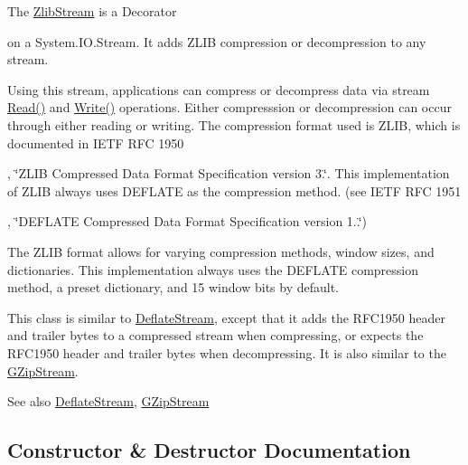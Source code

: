 The \mbox{\hyperlink{class_super_tiled2_unity_1_1_ionic_1_1_zlib_1_1_zlib_stream}{Zlib\+Stream}} is a Decorator

on a System.\+I\+O.\+Stream. It adds Z\+L\+IB compression or decompression to any stream. 

Using this stream, applications can compress or decompress data via stream {\ttfamily \mbox{\hyperlink{class_super_tiled2_unity_1_1_ionic_1_1_zlib_1_1_zlib_stream_a0987720c2d2c6219e1f1cbd9ae8ee818}{Read()}}} and {\ttfamily \mbox{\hyperlink{class_super_tiled2_unity_1_1_ionic_1_1_zlib_1_1_zlib_stream_a042abef8f9aa0d0043e6081d9de7dea7}{Write()}}} operations. Either compresssion or decompression can occur through either reading or writing. The compression format used is Z\+L\+IB, which is documented in I\+E\+TF R\+FC 1950

, \char`\"{}\+Z\+L\+I\+B Compressed
\+Data Format Specification version 3.\char`\"{}. This implementation of Z\+L\+IB always uses D\+E\+F\+L\+A\+TE as the compression method. (see I\+E\+TF R\+FC 1951

, \char`\"{}\+D\+E\+F\+L\+A\+T\+E
\+Compressed Data Format Specification version 1..\char`\"{}) 

The Z\+L\+IB format allows for varying compression methods, window sizes, and dictionaries. This implementation always uses the D\+E\+F\+L\+A\+TE compression method, a preset dictionary, and 15 window bits by default. 

This class is similar to \mbox{\hyperlink{class_super_tiled2_unity_1_1_ionic_1_1_zlib_1_1_deflate_stream}{Deflate\+Stream}}, except that it adds the R\+F\+C1950 header and trailer bytes to a compressed stream when compressing, or expects the R\+F\+C1950 header and trailer bytes when decompressing. It is also similar to the \mbox{\hyperlink{class_super_tiled2_unity_1_1_ionic_1_1_zlib_1_1_g_zip_stream}{G\+Zip\+Stream}}. 

\begin{DoxySeeAlso}{See also}
\mbox{\hyperlink{class_super_tiled2_unity_1_1_ionic_1_1_zlib_1_1_deflate_stream}{Deflate\+Stream}}, \mbox{\hyperlink{class_super_tiled2_unity_1_1_ionic_1_1_zlib_1_1_g_zip_stream}{G\+Zip\+Stream}}


\end{DoxySeeAlso}


\subsection{Constructor \& Destructor Documentation}
\mbox{\label{class_super_tiled2_unity_1_1_ionic_1_1_zlib_1_1_zlib_stream_a626c8b9a6ae8fffc521a24efc94f6f39}} 
